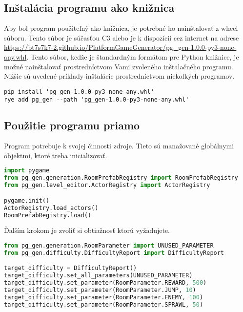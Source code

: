 
\subsection*{Inštalácia programu ako knižnica}

Aby bol program použiteľný ako knižnica, je potrebné ho nainštalovať z wheel súboru. Tento súbor je súčasťou C3 alebo je k dispozícií cez internet na adrese \url{https://bt7s7k7-2.github.io/PlatformGameGenerator/pg_gen-1.0.0-py3-none-any.whl}. Tento súbor, kedže je štandardným formátom pre Python knižnice, je možné nainštalovať prostredníctvom Vami zvoleného inštalačného programu. Nižšie sú uvedené príklady inštalácie prostredníctvom niekoľkých programov.

\begin{lstlisting}
pip install 'pg_gen-1.0.0-py3-none-any.whl'
rye add pg_gen --path 'pg_gen-1.0.0-py3-none-any.whl'
\end{lstlisting}


\subsection*{Použitie programu priamo}

Program potrebuje k svojej činnosti zdroje. Tieto sú manažované globálnymi objektmi, ktoré treba inicializovať.

\begin{lstlisting}[language=python]
import pygame
from pg_gen.generation.RoomPrefabRegistry import RoomPrefabRegistry
from pg_gen.level_editor.ActorRegistry import ActorRegistry

pygame.init()
ActorRegistry.load_actors()
RoomPrefabRegistry.load()
\end{lstlisting}

Ďalším krokom je zvoliť si obtiažnosť ktorú vyžadujete.

\begin{lstlisting}[language=python]
from pg_gen.generation.RoomParameter import UNUSED_PARAMETER
from pg_gen.difficulty.DifficultyReport import DifficultyReport

target_difficulty = DifficultyReport()
target_difficulty.set_all_parameters(UNUSED_PARAMETER)
target_difficulty.set_parameter(RoomParameter.REWARD, 500)
target_difficulty.set_parameter(RoomParameter.JUMP, 10)
target_difficulty.set_parameter(RoomParameter.ENEMY, 100)
target_difficulty.set_parameter(RoomParameter.SPRAWL, 50)
\end{lstlisting}




